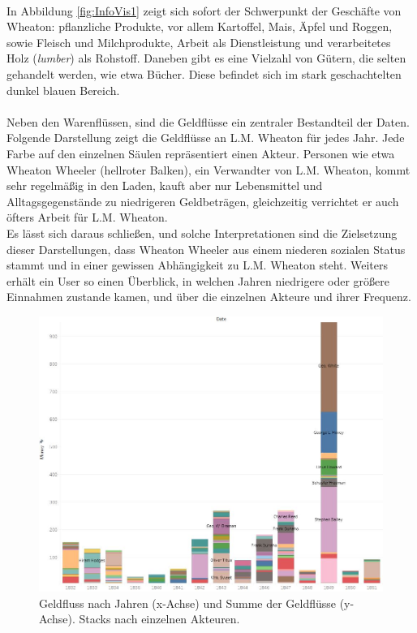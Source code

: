 \documentclass[12pt,a4paper]{article}
\begin{document}
\\
In Abbildung \ref{fig:InfoVis1} zeigt sich sofort der Schwerpunkt der Geschäfte von Wheaton: pflanzliche Produkte, vor allem Kartoffel, Mais, Äpfel und Roggen, sowie Fleisch und Milchprodukte, Arbeit als Dienstleistung und verarbeitetes Holz (\textit{lumber}) als Rohstoff. Daneben gibt es eine Vielzahl von Gütern, die selten gehandelt werden, wie etwa Bücher. Diese befindet sich im stark geschachtelten dunkel blauen Bereich.
\\
\\
Neben den Warenflüssen, sind die Geldflüsse ein zentraler Bestandteil der Daten. Folgende Darstellung zeigt die Geldflüsse an L.M. Wheaton für jedes Jahr. Jede Farbe auf den einzelnen Säulen repräsentiert einen Akteur. Personen wie etwa Wheaton Wheeler (hellroter Balken), ein Verwandter von L.M. Wheaton, kommt sehr regelmäßig in den Laden, kauft aber nur Lebensmittel und Alltagsgegenstände zu niedrigeren Geldbeträgen, gleichzeitig verrichtet er auch öfters Arbeit für L.M. Wheaton.
\\
Es lässt sich daraus schließen, und solche Interpretationen sind die Zielsetzung dieser Darstellungen, dass Wheaton Wheeler aus einem niederen sozialen Status stammt und in einer gewissen Abhängigkeit zu L.M. Wheaton steht. Weiters erhält ein User so einen Überblick, in welchen Jahren niedrigere oder größere Einnahmen zustande kamen, und über die einzelnen Akteure und ihrer Frequenz.
\begin{figure}[H]
\centering
	\includegraphics[width=1\textwidth]{img/infovis2.jpg}  
    \caption[Geldfluss nach Jahren (x-Achse) und Summe der Geldflüsse (y-Achse). Stacks nach einzelnen Akteuren, eigene Darstellung, erstellt mit Tableau Desktop]{Geldfluss nach Jahren (x-Achse) und Summe der Geldflüsse (y-Achse). Stacks nach einzelnen Akteuren.} \label{fig:InfoVis2}
\end{figure}
\end{document}
